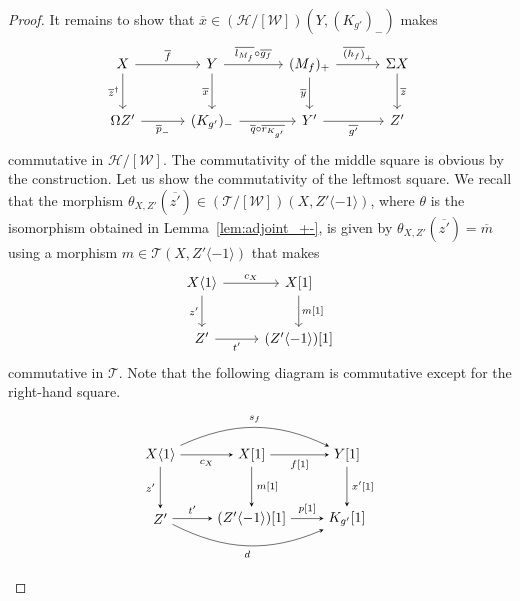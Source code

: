 \documentclass[a4paper,reqno,10pt]{amsart}
\theoremstyle{definition}
\theoremstyle{definition}
\theoremstyle{definition}
\theoremstyle{definition}
\theoremstyle{plain}
\newcommand{\CH}{\mathcal{H}}
\newcommand{\CT}{\mathcal{T}}
\newcommand{\CW}{\mathcal{W}}
\begin{document}
\begin{proof}
It remains to show that $\overline{x}\in(\CH/[\CW])(Y,(K_{g'})_-)$ makes
\begin{equation}\label{diag_for_PTR}
\begin{tikzcd}[row sep=0.8cm, column sep=1.1cm]
X
\arrow{r}{\overline{f}}
\arrow[d, swap, "\overline{z}^{\dagger}"]
&Y
\arrow{r}{\overline{l_{M_f}}\circ \overline{g_f}}
\arrow[d, swap, "\overline{x}"]
&(M_f)_+
\arrow{r}{\overline{(h_f)}_+}
\arrow[d, swap, "\overline{y}"]
&\Sigma X 
\arrow[d, "\overline{z}"]
\\
\Omega Z'
\arrow{r}[swap]{\overline{p}_-}
&(K_{g'})_-
\arrow{r}[swap]{\overline{q}\circ \overline{r_{K_{g'}}}}
&Y' 
\arrow{r}[swap]{\overline{g'}}
&Z'
\end{tikzcd}
\end{equation}
commutative in $\CH/[\CW]$. 
The commutativity of the middle square is obvious by the construction.
Let us show the commutativity of the leftmost square. We recall that the morphism $\theta_{X,Z'}(\overline{z'})\in (\CT/[\CW])(X,Z'\langle-1\rangle)$, where $\theta$ is the isomorphism obtained in Lemma~\ref{lem:adjoint_+-}, is given by
$\theta_{X,Z'}(\overline{z'})=\overline{m}$
using a morphism $m\in\CT(X,Z'\langle-1\rangle)$ that makes
\[
\begin{tikzcd}[row sep=0.8cm, column sep=0.9cm]
X\langle1\rangle 
\arrow{r}{c_X}
\arrow{d}[swap]{z'}
&X[1] 
\arrow{d}{m{[}1{]}}
\\
Z' 
\arrow{r}[swap]{t'}
&(Z'\langle-1\rangle){[}1{]}
\end{tikzcd}
\]
commutative in $\CT$. Note that the following diagram is commutative except for the right-hand square.
\[
\begin{tikzpicture}[>=stealth]
\node (1) at (-2.3,0.8) {$X\langle1\rangle$};
\node (2) at (0,0.8) {$X{[}1{]}$};
\node (3) at (2.4,0.8) {$Y{[}1{]}$};
\node (4) at (-2.3,-0.8) {$Z'$};
\node (5) at (0,-0.8) {$(Z'\langle-1\rangle){[}1{]}$};
\node (6) at (2.4,-0.8) {$K_{g'}{[}1{]}$};
\draw[->] (1) -- node[below,font=\scriptsize] {$c_X$} (2);
\draw[->,bend left=25] (1) to node[above,font=\scriptsize] {$s_f$} (3);
\draw[->] (2) -- node[below,font=\scriptsize] {$f{[}1{]}$} (3);
\draw[->] (1) -- node[left,font=\scriptsize] {$z'$} (4);
\draw[->] (2) -- node[right,font=\scriptsize] {$m{[}1{]}$} (5);
\draw[->] (4) -- node[above,font=\scriptsize] {$t'$} (5);
\draw[->] (5) -- node[above,font=\scriptsize] {$p{[}1{]}$} (6);
\draw[->] (3) -- node[right,font=\scriptsize] {$x'{[}1{]}$} (6);
\draw[->,bend right=25] (4) to node[below,font=\scriptsize] {$d$} (6);
\end{tikzpicture}
\]
\end{proof}
\end{document}
